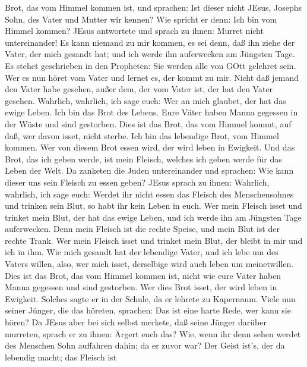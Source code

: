 Brot, das vom Himmel kommen ist,  und sprachen: Ist dieser
nicht JEsus, Josephs Sohn, des Vater und Mutter wir kennen? Wie spricht
er denn: Ich bin vom Himmel kommen?  JEsus antwortete und
sprach zu ihnen: Murret nicht untereinander!  Es kann
niemand zu mir kommen, es sei denn, daß ihn ziehe der Vater, der mich
gesandt hat; und ich werde ihn auferwecken am Jüngsten Tage.
 Es stehet geschrieben in den Propheten: Sie werden alle
von GOtt gelehret sein. Wer es nun höret vom Vater und lernet es, der
kommt zu mir.  Nicht daß jemand den Vater habe gesehen,
außer dem, der vom Vater ist, der hat den Vater gesehen. 
Wahrlich, wahrlich, ich sage euch: Wer an mich glaubet, der hat das
ewige Leben.  Ich bin das Brot des Lebens. 
Eure Väter haben Manna gegessen in der Wüste und sind gestorben.
 Dies ist das Brot, das vom Himmel kommt, auf daß, wer
davon isset, nicht sterbe.  Ich bin das lebendige Brot, vom
Himmel kommen. Wer von diesem Brot essen wird, der wird leben in
Ewigkeit. Und das Brot, das ich geben werde, ist mein Fleisch, welches
ich geben werde für das Leben der Welt.  Da zanketen die
Juden untereinander und sprachen: Wie kann dieser uns sein Fleisch zu
essen geben?  JEsus sprach zu ihnen: Wahrlich, wahrlich,
ich sage euch: Werdet ihr nicht essen das Fleisch des Menschensohnes und
trinken sein Blut, so habt ihr kein Leben in euch.  Wer
mein Fleisch isset und trinket mein Blut, der hat das ewige Leben, und
ich werde ihn am Jüngsten Tage auferwecken.  Denn mein
Fleisch ist die rechte Speise, und mein Blut ist der rechte Trank.
 Wer mein Fleisch isset und trinket mein Blut, der bleibt
in mir und ich in ihm.  Wie mich gesandt hat der lebendige
Vater, und ich lebe um des Vaters willen, also, wer mich isset,
derselbige wird auch leben um meinetwillen.  Dies ist das
Brot, das vom Himmel kommen ist, nicht wie eure Väter haben Manna
gegessen und sind gestorben. Wer dies Brot isset, der wird leben in
Ewigkeit.  Solches sagte er in der Schule, da er lehrete zu
Kapernaum.  Viele nun seiner Jünger, die das höreten,
sprachen: Das ist eine harte Rede, wer kann sie hören?  Da
JEsus aber bei sich selbst merkete, daß seine Jünger darüber murreten,
sprach er zu ihnen: Ärgert euch das?  Wie, wenn ihr denn
sehen werdet des Menschen Sohn auffahren dahin; da er zuvor war?
 Der Geist ist's, der da lebendig macht; das Fleisch ist

